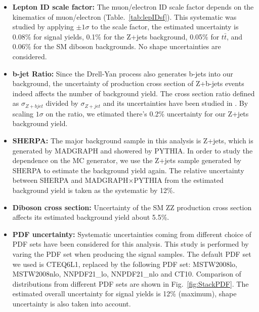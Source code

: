 \begin{itemize}
\item \textbf{Lepton ID scale factor:} The muon/electron ID scale factor depends on the kinematics of muon/electron (Table.~\ref{tab:lepIDsf}). This systematic was studied by applying $\pm 1 \sigma$ to the scale factor, the estimated uncertainty is 0.08\% for signal yields, 0.1\% for the Z+jets background, 0.05\% for $t\bar{t}$, and 0.06\% for the SM diboson backgrounds. No shape uncertainties are considered.
\item \textbf{b-jet Ratio:} Since the Drell-Yan process also generates b-jets into our background, the uncertainty of production cross section of Z+b-jets events indeed affects the number of background yield. The cross section ratio defined as $\sigma_{Z+bjet}$ divided by $\sigma_{Z+jet}$ and its uncertainties have been studied in \cite{SMP-13-004}. By scaling $1\sigma$ on the ratio, we etimated there's 0.2\% uncertainty for our Z+jets background yield.
\item \textbf{SHERPA:} The major background sample in this analysis is Z+jets, which is generated by MADGRAPH and showered by PYTHIA. In order to study the dependence on the MC generator, we use the Z+jets sample generated by SHERPA\cite{SHERPA} to estimate the background yield again. The relative uncertainty between SHERPA and MADGRAPH$\times$PYTHIA from the estimated background yield is taken as the systematic by 12\%.
\item \textbf{Diboson cross section:} Uncertainty of the SM ZZ production cross section affects its estimated background yield about 5.5\%.
\item \textbf{PDF uncertainty:} Systematic uncertainties coming from different choice of PDF sets have been considered for this analysis. This study is performed by varing the PDF set when producing the signal samples. The default PDF set we used is CTEQ6L1, replaced by the following PDF set: MSTW2008lo, MSTW2008nlo, NNPDF21\_lo, NNPDF21\_nlo and CT10. Comparison of distributions from different PDF sets are shown in Fig.~\ref{fig:StackPDF}. The estimated overall uncertainty for signal yields is 12\% (maximum), shape uncertainty is also taken into account.
\end{itemize}

